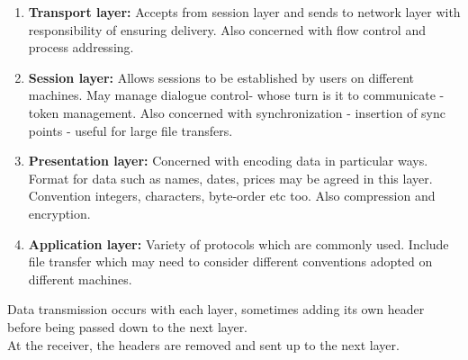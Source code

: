 \documentclass{beamer}
\begin{document}
\begin{frame}[allowframebreaks]
\begin{enumerate}
\item \textbf{Transport layer:} Accepts from session layer and sends to network layer with responsibility of ensuring delivery. Also concerned with flow control and process addressing.
\item \textbf{Session layer:} Allows sessions to be established by users on different machines. May manage dialogue control- whose turn is it to communicate - token management. Also concerned with synchronization - insertion of sync points - useful for large file transfers.
\item \textbf{Presentation layer:} Concerned with encoding data in particular ways. Format for data such as names, dates, prices may be agreed in this layer. Convention integers, characters, byte-order etc too. Also compression and encryption.
\item \textbf{Application layer:} Variety of protocols which are commonly used. Include file transfer which may need to consider different conventions adopted on different machines.
\end{enumerate}
Data transmission occurs with each layer, sometimes adding its own header before being passed down to the next layer.\\
At the receiver, the headers are removed and sent up to the next layer.
\end{frame}
\end{document}
